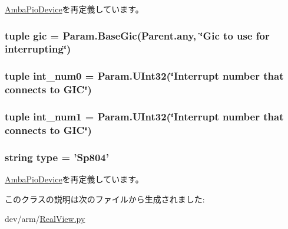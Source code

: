 \hyperlink{classRealView_1_1AmbaPioDevice_a17da7064bc5c518791f0c891eff05fda}{AmbaPioDevice}を再定義しています。\hypertarget{classRealView_1_1Sp804_a40243beb62d217c3a9e35801ae739fd0}{
\subsubsection[{gic}]{\setlength{\rightskip}{0pt plus 5cm}tuple {\bf gic} = Param.BaseGic(Parent.any, \char`\"{}Gic to use for interrupting\char`\"{})}}
\label{classRealView_1_1Sp804_a40243beb62d217c3a9e35801ae739fd0}
\hypertarget{classRealView_1_1Sp804_a8d446ae3c2f465cf5832be0409506c62}{
\subsubsection[{int\_\-num0}]{\setlength{\rightskip}{0pt plus 5cm}tuple {\bf int\_\-num0} = Param.UInt32(\char`\"{}Interrupt number that connects to GIC\char`\"{})}}
\label{classRealView_1_1Sp804_a8d446ae3c2f465cf5832be0409506c62}
\hypertarget{classRealView_1_1Sp804_a4556e7e3e444a3c9695c3aef876c6ef8}{
\subsubsection[{int\_\-num1}]{\setlength{\rightskip}{0pt plus 5cm}tuple {\bf int\_\-num1} = Param.UInt32(\char`\"{}Interrupt number that connects to GIC\char`\"{})}}
\label{classRealView_1_1Sp804_a4556e7e3e444a3c9695c3aef876c6ef8}
\hypertarget{classRealView_1_1Sp804_acce15679d830831b0bbe8ebc2a60b2ca}{
\subsubsection[{type}]{\setlength{\rightskip}{0pt plus 5cm}string {\bf type} = '{\bf Sp804}'}}
\label{classRealView_1_1Sp804_acce15679d830831b0bbe8ebc2a60b2ca}


\hyperlink{classRealView_1_1AmbaPioDevice_acce15679d830831b0bbe8ebc2a60b2ca}{AmbaPioDevice}を再定義しています。

このクラスの説明は次のファイルから生成されました:\begin{DoxyCompactItemize}
\item 
dev/arm/\hyperlink{RealView_8py}{RealView.py}\end{DoxyCompactItemize}
